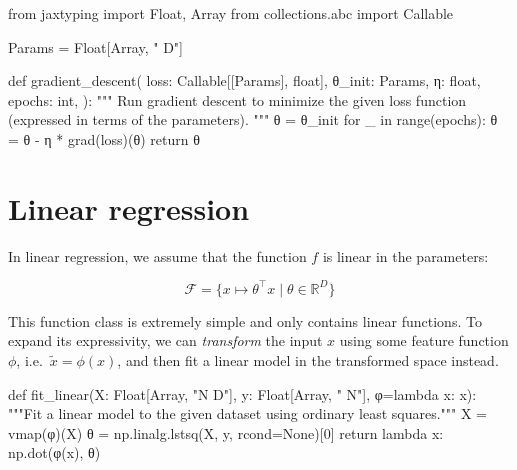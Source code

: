 \documentclass[
  letterpaper,
  DIV=11,
  numbers=noendperiod]{scrreprt}
\newenvironment{Shaded}{\begin{snugshade}}{\end{snugshade}}
\newcommand{\NormalTok}[1]{\textcolor[rgb]{0.00,0.23,0.31}{#1}}
\theoremstyle{plain}
\theoremstyle{plain}
\theoremstyle{definition}
\theoremstyle{definition}
\theoremstyle{remark}
\begin{document}
\begin{Shaded}
\begin{Highlighting}[]

\NormalTok{from jaxtyping import Float, Array}
\NormalTok{from collections.abc import Callable}
\end{Highlighting}
\end{Shaded}

\begin{Shaded}
\begin{Highlighting}[]
\NormalTok{Params = Float[Array, " D"]}


\NormalTok{def gradient\_descent(}
\NormalTok{    loss: Callable[[Params], float],}
\NormalTok{    θ\_init: Params,}
\NormalTok{    η: float,}
\NormalTok{    epochs: int,}
\NormalTok{):}
\NormalTok{    """}
\NormalTok{    Run gradient descent to minimize the given loss function}
\NormalTok{    (expressed in terms of the parameters).}
\NormalTok{    """}
\NormalTok{    θ = θ\_init}
\NormalTok{    for \_ in range(epochs):}
\NormalTok{        θ = θ {-} η * grad(loss)(θ)}
\NormalTok{    return θ}
\end{Highlighting}
\end{Shaded}

\section{Linear regression}\label{linear-regression}

In linear regression, we assume that the function \(f\) is linear in the
parameters:

\[
\mathcal{F} = \{ x \mapsto \theta^\top x \mid \theta \in \mathbb{R}^D \}
\]

This function class is extremely simple and only contains linear
functions. To expand its expressivity, we can \emph{transform} the input
\(x\) using some feature function \(\phi\),
i.e.~\(\widetilde x = \phi(x)\), and then fit a linear model in the
transformed space instead.

\begin{Shaded}
\begin{Highlighting}[]
\NormalTok{def fit\_linear(X: Float[Array, "N D"], y: Float[Array, " N"], φ=lambda x: x):}
\NormalTok{    """Fit a linear model to the given dataset using ordinary least squares."""}
\NormalTok{    X = vmap(φ)(X)}
\NormalTok{    θ = np.linalg.lstsq(X, y, rcond=None)[0]}
\NormalTok{    return lambda x: np.dot(φ(x), θ)}
\end{Highlighting}
\end{Shaded}
\end{document}
